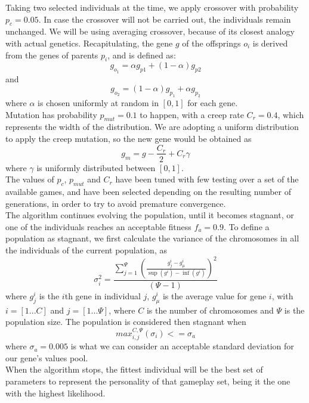 Taking two selected individuals at the time, we apply crossover with probability $p_c = 0.05$. In case the crossover will not be carried out, the individuals remain unchanged. We will be using averaging crossover, because of its closest analogy with actual genetics\cite{ladkany2012genetic}. Recapitulating, the gene $g$ of the offsprings $o_i$ is derived from the genes of parents $p_i$, and is defined as: $$g_{o_1} = \alpha g_{p1} + (1-\alpha)g_{p2}$$ and $$g_{o_2} = (1-\alpha) g_{p_1} + \alpha g_{p_2}$$ where $\alpha$ is chosen uniformly at random in $[0,1]$ for each gene.\\
Mutation has probability $p_{mut} = 0.1$ to happen, with a creep rate $C_r = 0.4$, which represents the width of the distribution. We are adopting a uniform distribution to apply the creep mutation, so the new gene would be obtained as $$g_m = g - \frac{C_r}{2} + C_r \gamma$$ where $\gamma$ is uniformly distributed between $[0,1]$.\\
The values of $p_{c}$, $p_{mut}$ and $C_r$ have been tuned with few testing over a set of the available games, and have been selected depending on the resulting number of generations, in order to try to avoid premature convergence.\\
The algorithm continues evolving the population, until it becomes stagnant, or one of the individuals reaches an acceptable fitness $f_a = 0.9$. To define a population as stagnant, we first calculate the variance of the chromosomes in all the individuals of the current population, as $$\sigma^2_i = \frac{\sum_{j=1}^{\Psi}\left({\frac{g_j^i-g^i_{\mu}}{\sup(g^i)-\inf(g^i)}}\right)^2}{(\Psi-1)}$$ where $g_j^i$ is the $i$th gene in individual $j$, $g^i_{\mu}$ is the average value for gene $i$, with $i = [1...C]$ and $j = [1...\Psi]$, where $C$ is the number of chromosomes and $\Psi$ is the population size. The population is considered then stagnant when $$max_{i, j}^{C, \Psi}(\sigma_i) <= \sigma_a$$ where $\sigma_a = 0.005$ is what we can consider an acceptable standard deviation for our gene's values pool.\\
When the algorithm stops, the fittest individual will be the best set of parameters to represent the personality of that gameplay set, being it the one with the highest likelihood.
